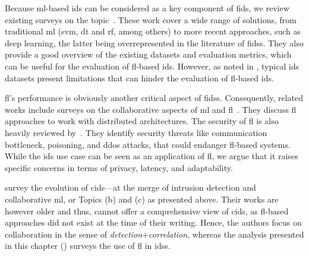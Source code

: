 Because \gls{ml}-based \gls{ids} can be considered as a key component of \gls{fids}, we review existing surveys on the topic~\cite{buczak_SurveyDataMining_2016,meng_WhenIntrusionDetection_2018,chaabouni_NetworkIntrusionDetection_2019,dacosta_InternetThingssurvey_2019}.
These work cover a wide range of solutions, from traditional \gls{ml} (\gls{svm}, \gls{dt} and \gls{rf}, among others) to more recent approaches, such as deep learning, the latter being overrepresented in the literature of \glspl{fids}.
They also provide a good overview of the existing datasets and evaluation metrics, which can be useful for the evaluation of \gls{fl}-based \gls{ids}.
However, as noted in , typical \gls{ids} datasets present limitations that can hinder the evaluation of \gls{fl}-based \gls{ids}.

\Gls{fl}'s performance is obviously another critical aspect of \glspl{fids}.
Consequently, related works include surveys on the collaborative aspects of \gls{ml} and \gls{fl}~\cite{aledhari_FederatedLearningSurvey_2020,lo_SystematicLiteratureReview_2021}.
They discuss \gls{fl} approaches to work with distributed architectures.
The security of \gls{fl} is also heavily reviewed by~\cite{shen_DistributedMachineLearning_2020,lyu_ThreatsFederatedLearning_2020,mothukuri_surveysecurityprivacy_2021}.
They identify security threats like communication bottleneck, poisoning, and \gls{ddos} attacks, that could endanger \gls{fl}-based systems.
While the \gls{ids} use case can be seen as an application of \gls{fl}, we argue that it raises specific concerns in terms of privacy, latency, and adaptability.

\textcite{zhou_surveycoordinatedattacks_2010,vasilomanolakis_TaxonomySurveyCollaborative_2015} survey the evolution of \gls{cids}---at the merge of intrusion
detection and collaborative \gls{ml}, or Topics (b) and (c) as presented above.
Their works are however older and thus, cannot offer a comprehensive view of \gls{cids}, as \gls{fl}-based approaches did not exist at the time of their writing.
Hence, the authors focus on collaboration in the sense of \emph{detection}$+$\emph{correlation}, whereas the analysis presented in this chapter () surveys the use of \gls{fl} in \glspl{ids}.

